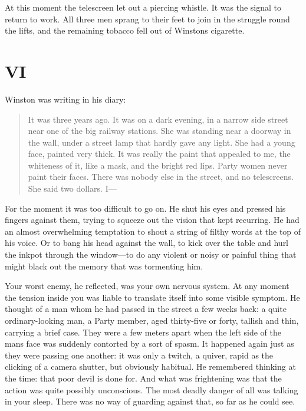 At this moment the telescreen let out a piercing whistle. It was the
signal to return to work. All three men sprang to their feet to join in
the struggle round the lifts, and the remaining tobacco fell out of
Winston\textquotesingle s cigarette.


\section{VI}\label{vi}

Winston was writing in his diary:

\begin{quotation}
It was three years ago. It was on a dark evening, in a narrow side
street near one of the big railway stations. She was standing near a
doorway in the wall, under a street lamp that hardly gave any light. She
had a young face, painted very thick. It was really the paint that
appealed to me, the whiteness of it, like a mask, and the bright red
lips. Party women never paint their faces. There was nobody else in the
street, and no telescreens. She said two dollars. I---
\end{quotation}

For the moment it was too difficult to go on. He shut his eyes and
pressed his fingers against them, trying to squeeze out the vision that
kept recurring. He had an almost overwhelming temptation to shout a
string of filthy words at the top of his voice. Or to bang his head
against the wall, to kick over the table and hurl the inkpot through the
window---to do any violent or noisy or painful thing that might black
out the memory that was tormenting him.

Your worst enemy, he reflected, was your own nervous system. At any
moment the tension inside you was liable to translate itself into some
visible symptom. He thought of a man whom he had passed in the street a
few weeks back: a quite ordinary-looking man, a Party member, aged
thirty-five or forty, tallish and thin, carrying a brief case. They were
a few meters apart when the left side of the man\textquotesingle s face
was suddenly contorted by a sort of spasm. It happened again just as
they were passing one another: it was only a twitch, a quiver, rapid as
the clicking of a camera shutter, but obviously habitual. He remembered
thinking at the time: that poor devil is done for. And what was
frightening was that the action was quite possibly unconscious. The most
deadly danger of all was talking in your sleep. There was no way of
guarding against that, so far as he could see.

